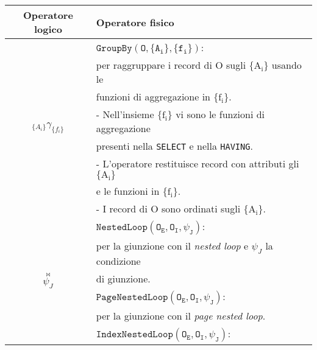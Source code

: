 \begin{table}[H]
	\centering
	\begin{tabular}{|c|l|}
		\hline
		Operatore logico                                & Operatore fisico                                                      \\\hline\hline
		\multirow{8}{4em}{$_{\{A_i\}}\gamma_{\{f_i\}}$} & $\mathtt{GroupBy(O, \{A_i\}, \{f_i\})}$:                              \\
		                                                & per raggruppare i record di O sugli $\mathrm{\{A_i\}}$ usando le      \\
		                                                & funzioni di aggregazione in $\mathrm{\{f_i\}}$.                       \\
		                                                & - Nell'insieme $\mathrm{\{f_i\}}$ vi sono le funzioni di aggregazione \\
		                                                & \quad presenti nella \texttt{SELECT} e nella \texttt{HAVING}.         \\
		                                                & - L'operatore restituisce record con attributi gli $\mathrm{\{A_i\}}$ \\
		                                                & \quad e le funzioni in $\mathrm{\{f_i\}}$.                            \\
		                                                & - I record di O sono ordinati sugli $\mathrm{\{A_i\}}$.               \\\hline
		\multirow{16}{2em}{$\stackrel{\Join}{\psi_J}$}  & $\mathtt{NestedLoop(O_E, O_I, \psi_J)}$:                              \\
		                                                & per la giunzione con il \textit{nested loop} e $\psi_J$ la condizione \\
		                                                & di giunzione.                                                         \\\cline{2-2}
		                                                & $\mathtt{PageNestedLoop(O_E, O_I, \psi_J)}$:                          \\
		                                                & per la giunzione con il \textit{page nested loop}.                    \\\cline{2-2}
		                                                & $\mathtt{IndexNestedLoop(O_E, O_I, \psi_J)}$:                         \\

\end{tabular}
\end{table}
